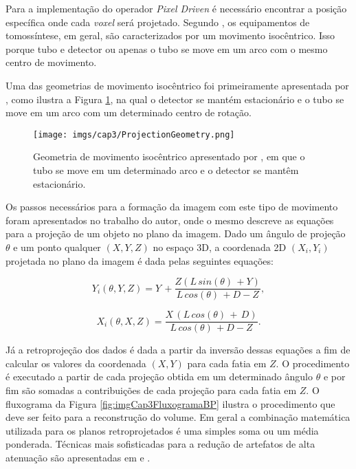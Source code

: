 Para a implementação do operador \textit{Pixel Driven} é necessário encontrar a posição específica onde cada \textit{voxel} será projetado. Segundo , os equipamentos de tomossíntese, em geral, são caracterizados por um movimento isocêntrico. Isso porque tubo e detector ou apenas o tubo se move em um arco com o mesmo centro de movimento. 

Uma das geometrias de movimento isocêntrico foi primeiramente apresentada por , como ilustra a Figura \ref{fig:imgCap3ProjectionGeometry}, na qual o detector se mantém estacionário e o tubo se move em um arco com um determinado centro de rotação. 

\begin{figure}[htb]
	\caption{Geometria de movimento isocêntrico apresentado por , em que o tubo se move em um determinado arco e o detector se mantêm estacionário.}
	\begin{center}
		\texttt{[image: imgs/cap3/ProjectionGeometry.png]}
	\end{center}
	\label{fig:imgCap3ProjectionGeometry}
\end{figure}

Os passos necessários para a formação da imagem com este tipo de movimento foram apresentados no trabalho do autor, onde o mesmo descreve as equações para a projeção de um objeto no plano da imagem. Dado um ângulo de projeção $\theta$ e um ponto qualquer $(X,Y,Z)$ no espaço \acs{3D}, a coordenada \acs{2D} $(X_{i},Y_{i})$ projetada no plano da imagem é dada pelas seguintes equações:

\begin{equation}
Y_{i}(\theta,Y,Z) = Y \, + \dfrac{ Z(L \, sin(\theta) \, + Y)}{L \, cos(\theta) \, + D - Z},
\label{eq:eqCap3ProjectionY}
\end{equation} 

\begin{equation}
X_{i}(\theta,X,Z) = \dfrac{X \, (L \, cos(\theta)\,+\, D)}{L \, cos(\theta) \, + D - Z}.
\label{eq:eqCap3ProjectionX}
\end{equation} 

Já a retroprojeção dos dados é dada a partir da inversão dessas equações a fim de calcular os valores da coordenada $(X,Y)$ para cada fatia em $Z$. O procedimento é executado a partir de cada projeção obtida em um determinado ângulo $\theta$ e por fim são somadas a contribuições de cada projeção para cada fatia em $Z$. O fluxograma da Figura \ref{fig:imgCap3FluxogramaBP} ilustra o procedimento que deve ser feito para a reconstrução do volume. Em geral a combinação matemática utilizada para os planos retroprojetados é uma simples soma ou um média ponderada. Técnicas mais sofisticadas para a redução de artefatos de alta atenuação são apresentadas em  e .

